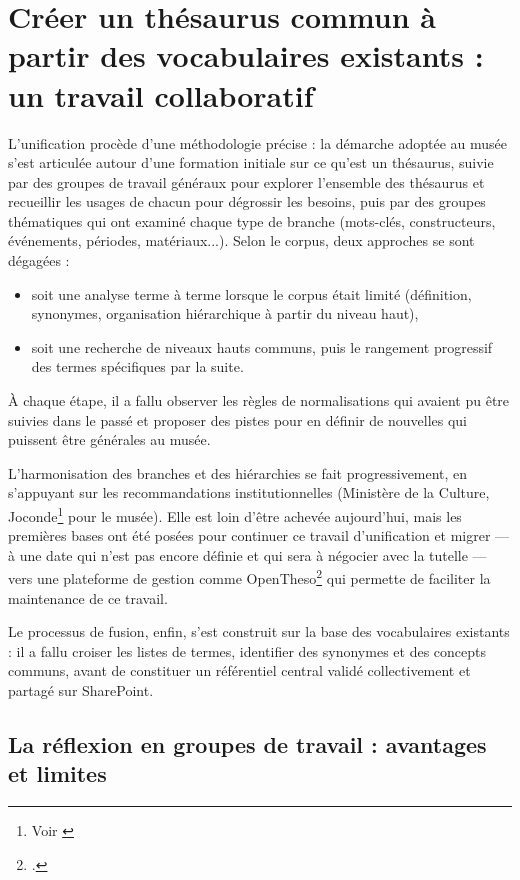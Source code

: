 \section{\label{III-B-2}Créer un thésaurus commun à partir des vocabulaires existants : un travail collaboratif}

L’unification procède d’une méthodologie précise : la démarche adoptée au musée s’est articulée autour d’une formation initiale sur ce qu’est un thésaurus, suivie par des groupes de travail généraux pour explorer l'ensemble des thésaurus et recueillir les usages de chacun pour dégrossir les besoins, puis par des groupes thématiques qui ont examiné chaque type de branche (mots-clés, constructeurs, événements, périodes, matériaux...). Selon le corpus, deux approches se sont dégagées : 
\begin{itemize}
	\item soit une analyse terme à terme lorsque le corpus était limité (définition, synonymes, organisation hiérarchique à partir du niveau haut),
	\item soit une recherche de niveaux hauts communs, puis le rangement progressif des termes spécifiques par la suite.
\end{itemize}
À chaque étape, il a fallu observer les règles de normalisations qui avaient pu être suivies dans le passé et proposer des pistes pour en définir de nouvelles qui puissent être générales au musée.

L’harmonisation des branches et des hiérarchies se fait progressivement, en s’appuyant sur les recommandations institutionnelles (Ministère de la Culture, Joconde\footnote{Voir \cite{ministeredelacultureVocabulairesScientifiquesService2014}} pour le musée). Elle est loin d'être achevée aujourd'hui, mais les premières bases ont été posées pour continuer ce travail d'unification et migrer --- à une date qui n'est pas encore définie et qui sera à négocier avec la tutelle --- vers une plateforme de gestion comme OpenTheso\footcite{OpenThesoa} qui permette de faciliter la maintenance de ce travail.

Le processus de fusion, enfin, s’est construit sur la base des vocabulaires existants : il a fallu croiser les listes de termes, identifier des synonymes et des concepts communs, avant de constituer un référentiel central validé collectivement et partagé sur SharePoint.

\subsection{La réflexion en groupes de travail : avantages et limites}

